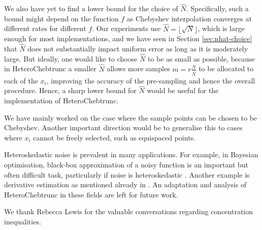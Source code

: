 \documentclass[pdflatex,sn-mathphys-num]{sn-jnl}%
\theoremstyle{thmstyleone}%
\theoremstyle{thmstyletwo}%
\theoremstyle{thmstylethree}%
\begin{document}
We also have yet to find a lower bound for the choice of $\hat{N}$. Specifically, such a bound might depend on the function $f$ as Chebyshev interpolation converges at different rates for different $f$. Our experiments use $\hat{N} = \lfloor \sqrt{N}\rfloor$, which is large enough for most implementations, and we have seen in Section \ref{sec:nhat-choice} that $\hat{N}$ does not substantially impact uniform error as long as it is moderately large. But ideally, one would like to choose $\hat{N}$ to be as small as possible, because in HeteroChebtrunc a smaller $\hat{N}$ allows more samples $m = r\frac{N}{\hat{N}}$ to be allocated to each of the $x_i$, improving the accuracy of the pre-sampling and hence the overall procedure. Hence, a sharp lower bound for $\hat{N}$ would be useful for the implementation of HeteroChebtrunc. 

We have mainly worked on the case where the sample points can be chosen to be Chebyshev. Another important direction would be to generalise this to cases where $x_i$ cannot be freely selected, such as equispaced points.

Heteroskedastic noise is prevalent in many applications. For example, in Bayesian optimisation, black-box approximation of a noisy function is an important but often difficult task, particularly if noise is heteroskedastic \cite{black-box, black-box-2,black-box-3}. Another example is derivative estimation as mentioned already in \cite{yuji}. An adaptation and analysis of HeteroChebtrunc in these fields are left for future work.



We thank Rebecca Lewis for the valuable conversations regarding concentration inequalities.



\end{document}
